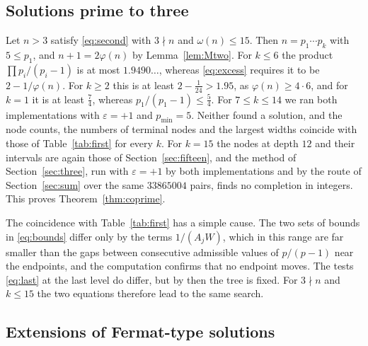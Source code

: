 \documentclass[screen,reqno]{aomart}
\numberwithin{equation}{section}
\theoremstyle{plain}
\theoremstyle{definition}
\theoremstyle{remark}
\begin{document}
\subsection{Solutions prime to three}
Let $n>3$ satisfy \eqref{eq:second} with $3\nmid n$ and
$\omega(n)\le15$. Then $n=p_1\cdots p_k$ with $5\le p_1$, and
$n+1=2\varphi(n)$ by Lemma~\ref{lem:Mtwo}. For $k\le6$ the product
$\prod p_i/(p_i-1)$ is at most $1.9490\ldots$, whereas
\eqref{eq:excess} requires it to be $2-1/\varphi(n)$. For $k\ge2$
this is at least $2-\frac1{24}>1.95$, as $\varphi(n)\ge4\cdot6$, and
for $k=1$ it is at least $\frac74$, whereas $p_1/(p_1-1)\le\frac54$. For
$7\le k\le14$ we ran both implementations with $\varepsilon=+1$ and
$p_{\min}=5$. Neither found a solution, and the node counts, the
numbers of terminal nodes and the largest widths coincide with those
of Table~\ref{tab:first} for every $k$. For $k=15$ the nodes at depth
$12$ and their intervals are again those of
Section~\ref{sec:fifteen}, and the method of Section~\ref{sec:three},
run with $\varepsilon=+1$ by both implementations and by the route of
Section~\ref{sec:sum} over the same $33865004$ pairs, finds no
completion in integers. This proves
Theorem~\ref{thm:coprime}.

The coincidence with Table~\ref{tab:first} has a simple cause. The
two sets of bounds in \eqref{eq:bounds} differ only by the terms
$1/(A_jW)$, which in this range are far smaller than the gaps between
consecutive admissible values of $p/(p-1)$ near the endpoints, and the
computation confirms that no endpoint moves. The tests
\eqref{eq:last} at the last level do differ, but by then the tree is
fixed. For $3\nmid n$ and $k\le15$ the two equations therefore lead to the
same search.

\subsection{Extensions of Fermat-type solutions}
\end{document}
